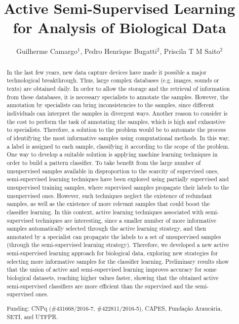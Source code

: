 \documentclass[twoside]{article}
\title{\vspace{-15mm}\fontsize{24pt}{10pt}\selectfont\textbf{Active Semi-Supervised Learning for Analysis of Biological Data}} %
\author{Guilherme Camargo$^1$, Pedro Henrique Bugatti$^2$, Priscila T M Saito$^2$}
\affil{1 PROGRAMA DE P\'OS-GRADUA\c{C}\~AO EM BIOINFORM\'ATICA - PPGBIOINFO, UNIVERSIDADE TECNOL\'OGICA FEDERAL DO PARAN\'A, CORN\'ELIO PROC\'OPIO\\ 2 FEDERAL UNIVERSITY OF TECHNOLOGY - PARANA\\ }
\date{}
\begin{document}
\maketitle %

\thispagestyle{fancy} %


\begin{abstract}
In the last few years, new data capture devices have made it possible a major technological breakthrough. Thus, large complex databases (e.g. images, sounds or texts) are obtained daily. In order to allow the storage and the retrieval of information from these databases, it is necessary specialists to annotate the samples. However, the annotation by specialists can bring inconsistencies to the samples, since different individuals can interpret the samples in divergent ways. Another reason to consider is the cost to perform the task of annotating the samples, which is high and exhaustive to specialists. Therefore, a solution to the problem would be to automate the process of identifying the most informative samples using computational methods. In this way, a label is assigned to each sample, classifying it according to the scope of the problem. One way to develop a suitable solution is applying machine learning techniques in order to build a pattern classifier. To take benefit from the large number of unsupervised samples available in disproportion to the scarcity of supervised ones, semi-supervised learning techniques have been explored using partially supervised and unsupervised training samples, where supervised samples propagate their labels to the unsupervised ones. However, such techniques neglect the existence of redundant samples, as well as the existence of more relevant samples that could boost the classifier learning. In this context, active learning techniques associated with semi-supervised techniques are interesting, since a smaller number of more informative samples automatically selected through the active learning strategy, and then annotated by a specialist can propagate the labels to a set of unsupervised samples (through the semi-supervised learning strategy). Therefore, we developed a new active semi-supervised learning approach for biological data, exploring new strategies for selecting more informative samples for the classifier learning. Preliminary results show that the union of active and semi-supervised learning improves accuracy for some biological datasets, reaching higher values faster, showing that the obtained active semi-supervised classifiers are more efficient than the supervised and the semi-supervised ones.

Funding: CNPq (\#431668/2016-7, \#422811/2016-5), CAPES, Funda\c{c}\~ao Arauc\'aria, SETI, and UTFPR.
\end{abstract}
\end{document}
